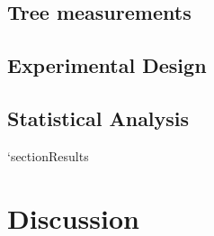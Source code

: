 \documentclass{article}
\begin{document}
\subsection{Tree measurements}


\subsection{Experimental Design}

\subsection{Statistical Analysis}
`section{Results}
\section{Discussion}

\printbibliography
\end{document}
